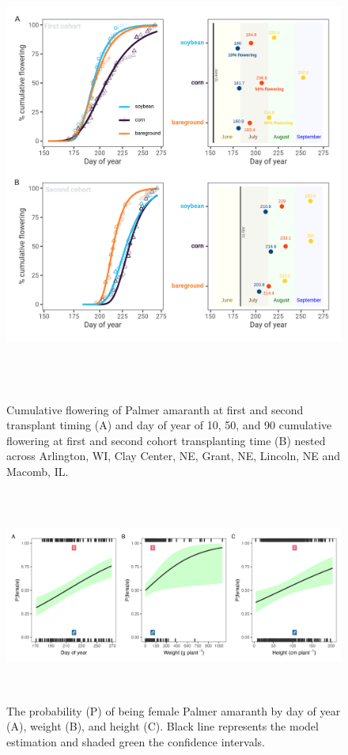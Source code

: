 \documentclass[utf8]{frontiersSCNS}
\begin{document}
\begin{figure}

{\centering \includegraphics[width=150mm,height=150mm]{../data analysis/figures/Figure 4} 

}

\caption{Cumulative flowering of Palmer amaranth at first and second transplant timing (A) and day of year of 10, 50, and 90 cumulative flowering at first and second cohort transplanting time (B) nested across Arlington, WI, Clay Center, NE, Grant, NE, Lincoln, NE and Macomb, IL.}\label{fig:Figure-4}
\end{figure}

\begin{figure}

{\centering \includegraphics[width=170mm,height=70mm]{../data analysis/figures/Figure 5} 

}

\caption{The probability (P) of being female Palmer amaranth by day of year (A), weight (B), and height (C). Black line represents the model estimation and shaded green the confidence intervals.}\label{fig:Figure-5}
\end{figure}
\end{document}
